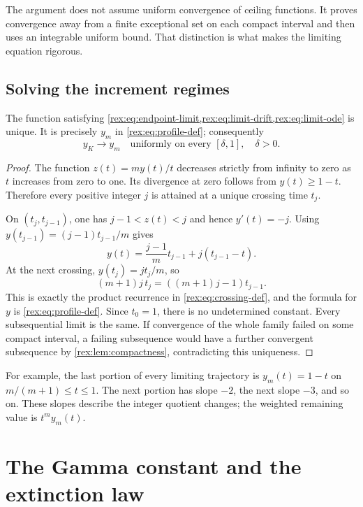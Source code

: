 The argument does not assume uniform convergence of ceiling functions.
It proves convergence away from a finite exceptional set on each compact
interval and then uses an integrable uniform bound. That distinction is
what makes the limiting equation rigorous.

\subsection{Solving the increment regimes}

\begin{proposition}\label{rex:prop:profile}
The function satisfying \cref{rex:eq:endpoint-limit,rex:eq:limit-drift,rex:eq:limit-ode}
is unique. It is precisely $y_m$ in \cref{rex:eq:profile-def}; consequently
\begin{equation}\label{rex:eq:backward-convergence}
 y_K\longrightarrow y_m
 \quad\text{uniformly on every }[\delta,1],\quad\delta>0.
\end{equation}
\end{proposition}

\begin{proof}
The function $z(t)=my(t)/t$ decreases strictly from infinity to zero as
$t$ increases from zero to one. Its divergence at zero follows from
$y(t)\geq1-t$. Therefore every positive integer $j$ is attained at a
unique crossing time $t_j$.

On $(t_j,t_{j-1})$, one has $j-1<z(t)<j$ and hence $y'(t)=-j$.
Using $y(t_{j-1})=(j-1)t_{j-1}/m$ gives
\[
 y(t)=\frac{j-1}{m}t_{j-1}+j(t_{j-1}-t).
\]
At the next crossing, $y(t_j)=jt_j/m$, so
\[
 (m+1)j\,t_j=((m+1)j-1)t_{j-1}.
\]
This is exactly the product recurrence in \cref{rex:eq:crossing-def}, and
the formula for $y$ is \cref{rex:eq:profile-def}. Since $t_0=1$, there is
no undetermined constant. Every subsequential limit is the same.
If convergence of the whole family failed on some compact interval,
a failing subsequence would have a further convergent subsequence by
\cref{rex:lem:compactness}, contradicting this uniqueness.
\end{proof}

For example, the last portion of every limiting trajectory is
$y_m(t)=1-t$ on $m/(m+1)\leq t\leq1$. The next portion has slope $-2$,
the next slope $-3$, and so on. These slopes describe the integer
quotient changes; the weighted remaining value is $t^m y_m(t)$.

\section{The Gamma constant and the extinction law}\label{rex:sec:constant}

